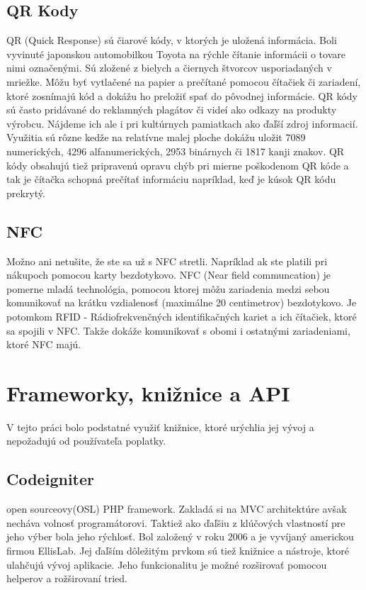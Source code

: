 \subsection{QR Kody} QR (Quick Response) sú čiarové kódy, v ktorých je uložená informácia. Boli vyvinuté japonskou automobilkou Toyota na rýchle čítanie informácii o tovare nimi označenými. Sú zložené z bielych a čiernych štvorcov usporiadaných v mriežke. Môžu byť vytlačené na papier a prečítané pomocou čítačiek či zariadení, ktoré zosnímajú kód a dokážu ho preložiť spať do pôvodnej informácie.  QR kódy sú často pridávané do reklamných plagátov či videí ako odkazy na produkty výrobcu. Nájdeme ich ale i pri kultúrnych pamiatkach ako ďaľší zdroj informacií. Využitia sú rôzne kedže na relatívne malej ploche dokážu uložit 7089 numerických, 4296 alfanumerických, 2953 binárnych či 1817 kanji znakov\cite{qrcode-about}. QR kódy obsahujú tiež pripravenú opravu chýb pri mierne poškodenom QR kóde a tak je čítačka schopná prečítať informáciu napríklad, keď je kúsok QR kódu prekrytý\cite{qrcode-about}. 

\subsection{NFC} Možno ani netušite, že ste sa už s NFC stretli. Napríklad ak ste platili pri nákupoch pomocou karty bezdotykovo. NFC (Near field communcation) je pomerne mladá technológia, pomocou ktorej môžu zariadenia medzi sebou komunikovať na krátku vzdialenosť (maximálne 20 centimetrov) bezdotykovo. Je potomkom RFID - Rádiofrekvenčných identifikačných kariet a ich čítačiek, ktoré sa spojili v NFC. Takže dokáže komunikovať s obomi i ostatnými zariadeniami, ktoré NFC majú.

\section{Frameworky, knižnice a API}
V tejto práci bolo podstatné využiť knižnice, ktoré urýchlia jej vývoj a nepožadujú od používateľa poplatky.

\subsection{Codeigniter} open sourceovy(OSL) PHP framework. Zakladá si na MVC architektúre avšak necháva volnosť programátorovi. Taktiež ako ďaľšiu z klúčových vlastností pre jeho výber bola jeho rýchlosť\cite{codeigniter-guide}. Bol založený v roku 2006 a je vyvíjaný americkou firmou EllisLab. Jej ďaľším dôležitým prvkom sú tiež knižnice a nástroje, ktoré ulahčujú vývoj aplikacie. Jeho funkcionalitu je možné rozširovať pomocou helperov a rožširovaní tried.

